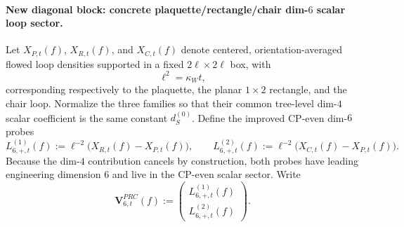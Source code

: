 \paragraph{New diagonal block: concrete plaquette/rectangle/chair dim-$6$ scalar loop sector.}
Let $X_{P,t}(f)$, $X_{R,t}(f)$, and $X_{C,t}(f)$ denote centered, orientation-averaged flowed loop densities supported in a fixed $2\ell\times 2\ell$ box, with
\[
\ell^2=\kappa_W t,
\]
corresponding respectively to the plaquette, the planar $1\times 2$ rectangle, and the chair loop.
Normalize the three families so that their common tree-level dim-$4$ scalar coefficient is the same constant $d_S^{(0)}$.
Define the improved CP-even dim-$6$ probes
\[
L_{6,+,t}^{(1)}(f):=\ell^{-2}\bigl(X_{R,t}(f)-X_{P,t}(f)\bigr),
\qquad
L_{6,+,t}^{(2)}(f):=\ell^{-2}\bigl(X_{C,t}(f)-X_{P,t}(f)\bigr).
\]
Because the dim-$4$ contribution cancels by construction, both probes have leading engineering dimension $6$ and live in the CP-even scalar sector.
Write
\[
\mathbf V_{6,t}^{PRC}(f):=
\begin{pmatrix}
L_{6,+,t}^{(1)}(f)\\[0.35em]
L_{6,+,t}^{(2)}(f)
\end{pmatrix}.
\]


